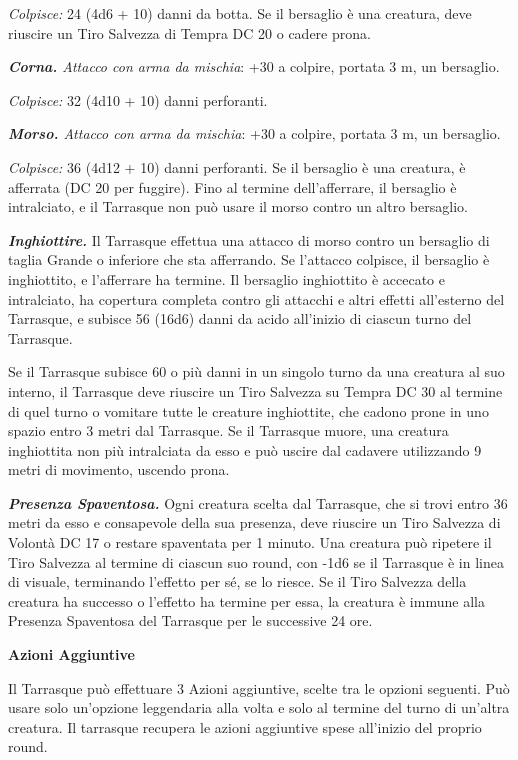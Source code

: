 \begin{multicols}{2}
	\textit{Colpisce:} 24 (4d6 + 10) danni da botta. Se il bersaglio è una creatura, deve riuscire un Tiro Salvezza di Tempra DC 20 o cadere prona.

	\textit{\textbf{Corna.} Attacco con arma da mischia}: +30 a colpire, portata 3 m, un bersaglio.

	\textit{Colpisce:} 32 (4d10 + 10) danni perforanti.

	\textit{\textbf{Morso.} Attacco con arma da mischia}: +30 a colpire, portata 3 m, un bersaglio.

	\textit{Colpisce:} 36 (4d12 + 10) danni perforanti. Se il bersaglio è una creatura, è afferrata (DC 20 per fuggire). Fino al termine dell'afferrare, il bersaglio è intralciato, e il Tarrasque non può usare il morso contro un altro bersaglio.

	\textit{\textbf{Inghiottire.}} Il Tarrasque effettua una attacco di morso contro un bersaglio di taglia Grande o inferiore che sta afferrando. Se l'attacco colpisce, il bersaglio è inghiottito, e l'afferrare ha termine. Il bersaglio inghiottito è accecato e intralciato, ha copertura completa contro gli attacchi e altri effetti all'esterno del Tarrasque, e subisce 56 (16d6) danni da acido all'inizio di ciascun turno del Tarrasque.

	Se il Tarrasque subisce 60 o più danni in un singolo turno da una creatura al suo interno, il Tarrasque deve riuscire un Tiro Salvezza su Tempra DC 30 al termine di quel turno o vomitare tutte le creature inghiottite, che cadono prone in uno spazio entro 3 metri dal Tarrasque. Se il Tarrasque muore, una creatura inghiottita non più intralciata da esso e può uscire dal cadavere utilizzando 9 metri di movimento, uscendo prona.

	\textit{\textbf{Presenza Spaventosa.}} Ogni creatura scelta dal Tarrasque, che si trovi entro 36 metri da esso e consapevole della sua presenza, deve riuscire un Tiro Salvezza di Volontà DC 17 o restare spaventata per 1 minuto. Una creatura può ripetere il Tiro Salvezza al termine di ciascun suo round, con -1d6 se il Tarrasque è in linea di visuale, terminando l'effetto per sé, se lo riesce. Se il Tiro Salvezza della creatura ha successo o l'effetto ha termine per essa, la creatura è immune alla Presenza Spaventosa del Tarrasque per le successive 24 ore.

	\textbf{Azioni Aggiuntive}

	Il Tarrasque può effettuare 3 Azioni aggiuntive, scelte tra le opzioni seguenti. Può usare solo un'opzione leggendaria alla volta e solo al termine del turno di un'altra creatura. Il tarrasque recupera le azioni aggiuntive spese all'inizio del proprio round.


\end{multicols}
